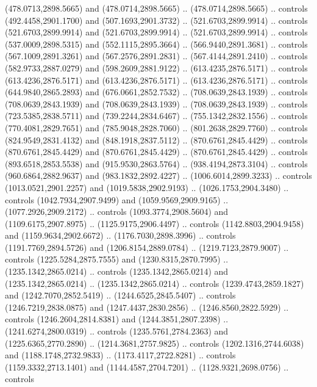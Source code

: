 \begin{scope}[shift={(296.85925,-6.26562)}]
\begin{scope}[shift={(-138.30846,-2572.6617)}]
\begin{scope}
        (478.0713,2898.5665) and (478.0714,2898.5665) .. (478.0714,2898.5665) ..
        controls (492.4458,2901.1700) and (507.1693,2901.3732) .. (521.6703,2899.9914)
        .. controls (521.6703,2899.9914) and (521.6703,2899.9914) ..
        (521.6703,2899.9914) .. controls (537.0009,2898.5315) and (552.1115,2895.3664)
        .. (566.9440,2891.3681) .. controls (567.1009,2891.3261) and
        (567.2576,2891.2831) .. (567.4144,2891.2410) .. controls (582.9733,2887.0279)
        and (598.2609,2881.9122) .. (613.4235,2876.5171) .. controls
        (613.4236,2876.5171) and (613.4236,2876.5171) .. (613.4236,2876.5171) ..
        controls (644.9840,2865.2893) and (676.0661,2852.7532) .. (708.0639,2843.1939)
        .. controls (708.0639,2843.1939) and (708.0639,2843.1939) ..
        (708.0639,2843.1939) .. controls (723.5385,2838.5711) and (739.2244,2834.6467)
        .. (755.1342,2832.1556) .. controls (770.4081,2829.7651) and
        (785.9048,2828.7060) .. (801.2638,2829.7760) .. controls (824.9549,2831.4132)
        and (848.1918,2837.5112) .. (870.6761,2845.4429) .. controls
        (870.6761,2845.4429) and (870.6761,2845.4429) .. (870.6761,2845.4429) ..
        controls (893.6518,2853.5538) and (915.9530,2863.5764) .. (938.4194,2873.3104)
        .. controls (960.6864,2882.9637) and (983.1832,2892.4227) ..
        (1006.6014,2899.3233) .. controls (1013.0521,2901.2257) and
        (1019.5838,2902.9193) .. (1026.1753,2904.3480) .. controls
        (1042.7934,2907.9499) and (1059.9569,2909.9165) .. (1077.2926,2909.2172) ..
        controls (1093.3774,2908.5604) and (1109.6175,2907.8975) ..
        (1125.9175,2906.4497) .. controls (1142.8803,2904.9458) and
        (1159.9634,2902.6672) .. (1176.7030,2898.3996) .. controls
        (1191.7769,2894.5726) and (1206.8154,2889.0784) .. (1219.7123,2879.9007) ..
        controls (1225.5284,2875.7555) and (1230.8315,2870.7995) ..
        (1235.1342,2865.0214) .. controls (1235.1342,2865.0214) and
        (1235.1342,2865.0214) .. (1235.1342,2865.0214) .. controls
        (1239.4743,2859.1827) and (1242.7070,2852.5419) .. (1244.6525,2845.5407) ..
        controls (1246.7219,2838.0875) and (1247.4437,2830.2856) ..
        (1246.8560,2822.5929) .. controls (1246.2604,2814.8381) and
        (1244.3851,2807.2398) .. (1241.6274,2800.0319) .. controls
        (1235.5761,2784.2363) and (1225.6365,2770.2890) .. (1214.3681,2757.9825) ..
        controls (1202.1316,2744.6038) and (1188.1748,2732.9833) ..
        (1173.4117,2722.8281) .. controls (1159.3332,2713.1401) and
        (1144.4587,2704.7201) .. (1128.9321,2698.0756) .. controls

\end{scope}
\end{scope}
\end{scope}
